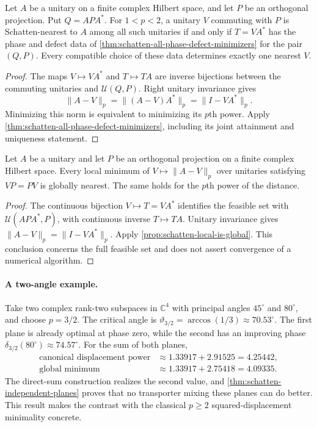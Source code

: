 \begin{corollary}
\label{cor:schatten-all-nearest-commuting}
Let $A$ be a unitary on a finite complex Hilbert space, and let $P$ be an
orthogonal projection. Put $Q=APA^*$. For $1<p<2$, a unitary $V$
commuting with $P$ is Schatten-nearest to $A$ among all such unitaries
if and only if $T=VA^*$ has the phase and defect data of
\cref{thm:schatten-all-phase-defect-minimizers} for the pair $(Q,P)$.
Every compatible choice of these data determines exactly one nearest $V$.
\end{corollary}

\begin{proof}
The maps $V\mapsto VA^*$ and $T\mapsto TA$ are inverse bijections
between the commuting unitaries and $\mathcal U(Q,P)$. Right unitary
invariance gives
\[
 \|A-V\|_p=\|(A-V)A^*\|_p=\|I-VA^*\|_p.
\]
Minimizing this norm is equivalent to minimizing its $p$th power.
Apply \cref{thm:schatten-all-phase-defect-minimizers}, including its
joint attainment and uniqueness statement.
\end{proof}

\begin{corollary}
\label{cor:schatten-correction-local-global}
Let $A$ be a unitary and let $P$ be an orthogonal projection on a finite
complex Hilbert space. Every local minimum of $V\mapsto\|A-V\|_p$
over unitaries satisfying $VP=PV$ is globally nearest. The same holds
for the $p$th power of the distance.
\end{corollary}

\begin{proof}
The continuous bijection $V\mapsto T=VA^*$ identifies the feasible
set with $\mathcal U(APA^*,P)$, with continuous inverse $T\mapsto TA$.
Unitary invariance gives $\|A-V\|_p=\|I-VA^*\|_p$.
Apply \cref{prop:schatten-local-is-global}. This conclusion concerns the full feasible
set and does not assert convergence of a numerical algorithm.
\end{proof}

\paragraph{A two-angle example.}
Take two complex rank-two subspaces in $\mathbb C^4$ with principal
angles $45^\circ$ and $80^\circ$, and choose $p=3/2$. The critical angle is
$\vartheta_{3/2}=\arccos(1/3)\approx70.53^\circ$. The first plane is
already optimal at phase zero, while the second has an improving phase
$\delta_{3/2}(80^\circ)\approx74.57^\circ$. For the sum of both planes,
\[
\begin{aligned}
\text{canonical displacement power}
  &\approx 1.33917+2.91525=4.25442,\\
\text{global minimum}
  &\approx 1.33917+2.75418=4.09335.
\end{aligned}
\]
The direct-sum construction realizes the second value, and
\cref{thm:schatten-independent-planes} proves that no transporter mixing
these planes can do better. This result makes the contrast with the
classical $p\geq2$ squared-displacement minimality concrete.

